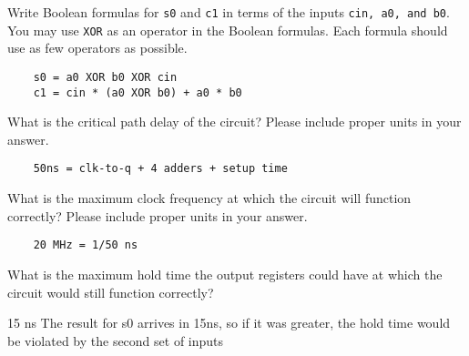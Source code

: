 \begin{blocksection}
\question
Write Boolean formulas for \lstinline$s0$ and \lstinline$c1$ in terms of the inputs \lstinline$cin, a0, and b0$. You may use \lstinline$XOR$ as an operator in the Boolean formulas. Each formula should use as few operators as possible.
\begin{solution}[0.7in]
    \begin{verbatim}
    s0 = a0 XOR b0 XOR cin
    c1 = cin * (a0 XOR b0) + a0 * b0
    \end{verbatim}
\end{solution}

\question
What is the critical path delay of the circuit? Please include proper units in your answer.
\begin{solution}[0.7in]
    \begin{verbatim}
    50ns = clk-to-q + 4 adders + setup time
    \end{verbatim}
\end{solution}


\question
What is the maximum clock frequency at which the circuit will function correctly? Please include proper units in your answer.
\begin{solution}[0.7in]
    \begin{verbatim}
    20 MHz = 1/50 ns
    \end{verbatim}
\end{solution}


\question
What is the maximum hold time the output registers could have at which the circuit would still function correctly?
\begin{solution}[0.7in]
15 ns
The result for s0 arrives in 15ns, so if it was greater, the hold time would be violated by the second set of inputs
\end{solution}

\end{blocksection}